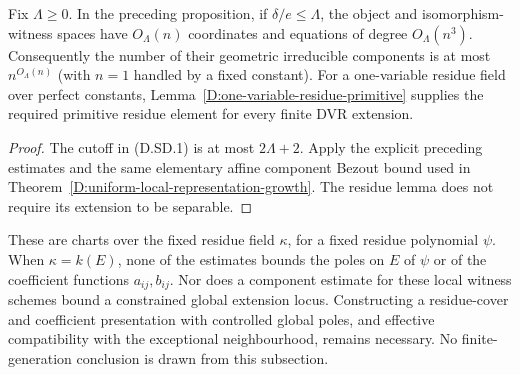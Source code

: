 \begin{corollary}
\label{D:sparse-DVR-normalized-different-complexity}
Fix $\Lambda\ge0$.  In the preceding proposition, if
$\delta/e\le\Lambda$, the object and isomorphism-witness
spaces have $O_\Lambda(n)$ coordinates and equations of
degree $O_\Lambda(n^3)$.  Consequently the number of their
geometric irreducible components is at most
$n^{O_\Lambda(n)}$ (with $n=1$ handled by a fixed constant).
For a one-variable residue field over perfect constants,
Lemma~\ref{D:one-variable-residue-primitive} supplies the
required primitive residue element for every finite DVR
extension.
\end{corollary}

\begin{proof}
The cutoff in (D.SD.1) is at most $2\Lambda+2$.
Apply the explicit preceding estimates and the same elementary
affine component Bezout bound used in
Theorem~\ref{D:uniform-local-representation-growth}.
The residue lemma does not require its extension to be separable.
\end{proof}

\begin{remark}
These are charts over the fixed residue field $\kappa$, for a
fixed residue polynomial $\psi$.  When $\kappa=k(E)$, none of
the estimates bounds the poles on $E$ of $\psi$ or of the
coefficient functions $a_{ij},b_{ij}$.
Nor does a component estimate for these local witness schemes
bound a constrained global extension locus.
Constructing a residue-cover and coefficient presentation
with controlled global poles, and effective compatibility
with the exceptional neighbourhood, remains necessary.
No finite-generation conclusion is drawn from this subsection.
\end{remark}
